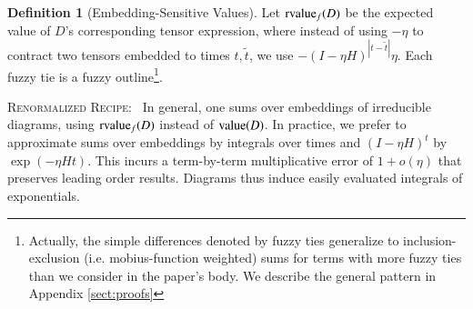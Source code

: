 \documentclass{article}
\theoremstyle{plain}
\theoremstyle{definition}
\newtheorem{defn}{Definition}
\newcommand{\dvalue}{\text{\textnormal{value}}}
\newcommand{\rvalue}{\text{\textnormal{rvalue}}}
\newcommand{\wabs}[1]{\left|#1\right|}
\begin{document}
        \begin{defn}[Embedding-Sensitive Values]
            Let $\rvalue_f(D)$ be the expected value of $D$'s corresponding
            tensor expression, where instead of using $-\eta$ to contract
            two tensors embedded to times $t, \tilde t$, we use
            $
                -(I-\eta H)^{\wabs{t-\tilde t}} \eta
            $.
            Each fuzzy tie is a fuzzy outline\footnote{
                Actually, the simple differences denoted by fuzzy ties
                generalize to inclusion-exclusion (i.e. mobius-function
                weighted) sums for terms with more fuzzy ties than we consider
                in the paper's body.  We describe the general pattern in
                Appendix \ref{sect:proofs} 
            }.
        \end{defn}

        \textsc{Renormalized Recipe:}~
            In general, one sums over embeddings of irreducible diagrams, using
            $\rvalue_f(D)$ instead of $\dvalue(D)$.  In practice, we prefer to
            approximate sums over embeddings by integrals over times and
            $(I-\eta H)^t$ by $\exp(- \eta H t)$.  This incurs a term-by-term
            multiplicative error of $1 + o(\eta)$ that preserves leading order
            results.  Diagrams thus induce easily evaluated integrals of
            exponentials.
       
\end{document}
